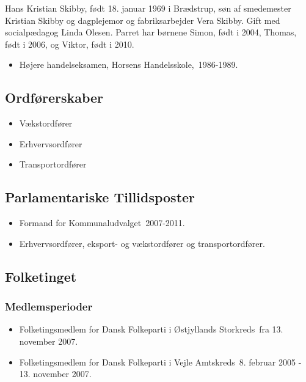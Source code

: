 \documentclass[11pt, a4paper]{awesome-cv}
\begin{document}
\makecvheader[R]
\makelettertitle
\begin{cvletter}
Hans Kristian Skibby, født 18. januar 1969 i Brædstrup, søn af smedemester Kristian Skibby og dagplejemor og fabriksarbejder Vera Skibby. Gift med socialpædagog Linda Olesen. Parret har børnene Simon, født i 2004, Thomas, født i 2006, og Viktor, født i 2010.

\begin{itemize}
\item Højere handelseksamen, Horsens Handelsskole, 1986-1989.
\end{itemize}
\subsection*{Ordførerskaber}
\begin{itemize}
\item Vækstordfører
\item Erhvervsordfører
\item Transportordfører
\end{itemize}
\subsection*{Parlamentariske Tillidsposter}
\begin{itemize}
\item Formand for Kommunaludvalget 2007-2011.
\item Erhvervsordfører, eksport- og vækstordfører og transportordfører.
\end{itemize}
\subsection*{Folketinget}
\subsubsection*{Medlemsperioder}
\begin{itemize}
\item Folketingsmedlem for Dansk Folkeparti i Østjyllands Storkreds fra 13. november 2007.
\item Folketingsmedlem for Dansk Folkeparti i Vejle Amtskreds 8. februar 2005 - 13. november 2007.
\end{itemize}

\end{cvletter}
\end{document}
